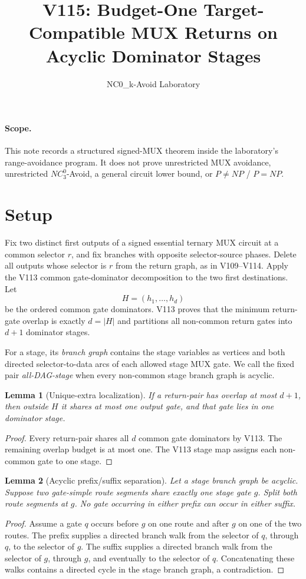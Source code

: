 \documentclass[11pt]{article}
\title{V115: Budget-One Target-Compatible MUX Returns on Acyclic Dominator Stages}
\author{NC0\_k-Avoid Laboratory}
\date{}
\newtheorem{lemma}{Lemma}
\begin{document}
\maketitle

\paragraph{Scope.}
This note records a structured signed-MUX theorem inside the laboratory's range-avoidance program.  It does not prove unrestricted MUX avoidance, unrestricted $NC^0_3$-Avoid, a general circuit lower bound, or $P\neq NP$ / $P=NP$.

\section{Setup}
Fix two distinct first outputs of a signed essential ternary MUX circuit at a common selector $r$, and fix branches with opposite selector-source phases.  Delete all outputs whose selector is $r$ from the return graph, as in V109--V114.  Apply the V113 common gate-dominator decomposition to the two first destinations.  Let
\[
H=(h_1,\ldots,h_d)
\]
be the ordered common gate dominators.  V113 proves that the minimum return-gate overlap is exactly $d=|H|$ and partitions all non-common return gates into $d+1$ dominator stages.

For a stage, its \emph{branch graph} contains the stage variables as vertices and both directed selector-to-data arcs of each allowed stage MUX gate.  We call the fixed pair \emph{all-DAG-stage} when every non-common stage branch graph is acyclic.

\begin{lemma}[Unique-extra localization]
If a return-pair has overlap at most $d+1$, then outside $H$ it shares at most one output gate, and that gate lies in one dominator stage.
\end{lemma}
\begin{proof}
Every return-pair shares all $d$ common gate dominators by V113.  The remaining overlap budget is at most one.  The V113 stage map assigns each non-common gate to one stage.
\end{proof}

\begin{lemma}[Acyclic prefix/suffix separation]
Let a stage branch graph be acyclic.  Suppose two gate-simple route segments share exactly one stage gate $g$.  Split both route segments at $g$.  No gate occurring in either prefix can occur in either suffix.
\end{lemma}
\begin{proof}
Assume a gate $q$ occurs before $g$ on one route and after $g$ on one of the two routes.  The prefix supplies a directed branch walk from the selector of $q$, through $q$, to the selector of $g$.  The suffix supplies a directed branch walk from the selector of $g$, through $g$, and eventually to the selector of $q$.  Concatenating these walks contains a directed cycle in the stage branch graph, a contradiction.
\end{proof}
\end{document}
